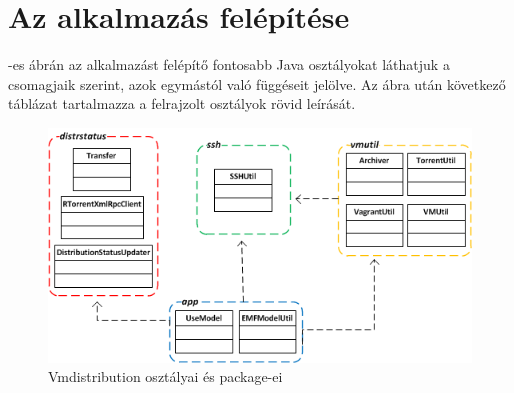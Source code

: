 \section{Az alkalmazás felépítése}

-es ábrán az alkalmazást felépítő fontosabb Java osztályokat láthatjuk a csomagjaik szerint, azok egymástól való függéseit jelölve. Az ábra után következő táblázat tartalmazza a felrajzolt osztályok rövid leírását.

\begin{figure}[ht]
\centering
\includegraphics[width=150mm, keepaspectratio]{figures/packagediag.png}
\caption{Vmdistribution osztályai és package-ei}
\label{fig:packagediag}
\end{figure}


